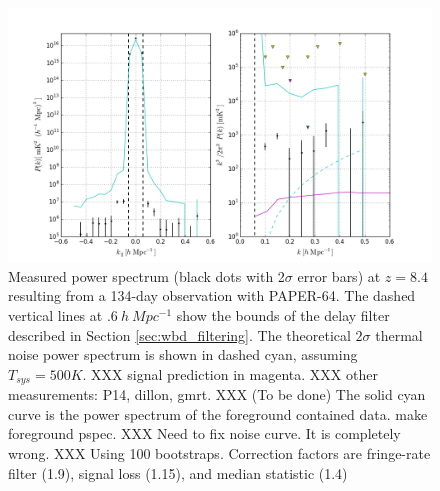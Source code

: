 \documentclass[twocolumn,numberedappendix]{emulateapj} \shorttitle{PSA64}
\begin{document}
%
%
%
%
%
%
%
%
%
%


\begin{figure}[h!]\centering
\includegraphics[width=2\columnwidth,height=1.2\columnwidth]{plots/pk_k3pk.png}
\caption{
Measured power spectrum (black dots with 2$\sigma$ error bars)
at $z=8.4$ resulting from a 134-day observation with PAPER-64.
The dashed
vertical lines at $.6\ h\ Mpc^{-1}$ show the bounds of the
delay filter described in Section \ref{sec:wbd_filtering}. The theoretical
$2\sigma$ thermal noise power spectrum is shown in dashed cyan, assuming
$T_{sys}=500K$.
XXX signal prediction in magenta.
XXX other measurements: P14, dillon, gmrt.
XXX (To be done) The solid cyan curve is the power spectrum of the
foreground contained data. make foreground pspec.
XXX Need to fix noise curve. It is completely wrong.
XXX Using 100 bootstraps. Correction factors are fringe-rate
filter (1.9), signal loss (1.15), and median statistic (1.4)}
\label{fig:final_pspec}
\end{figure}
\end{document}
